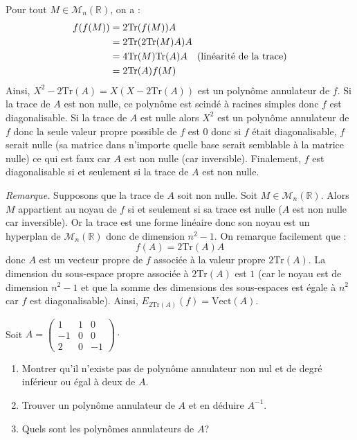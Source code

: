 \documentclass[a4paper,10pt]{report}
\begin{document}
\medskip
%

\noindent Pour tout $M \in \mathcal{M}_n(\mathbb{R})$, on a :
\begin{align*}
f(f(M)) & =  2\textrm{Tr}(f(M)) A \\
& = 2\textrm{Tr}(2\textrm{Tr}(M) A) A \\
& = 4 \textrm{Tr}(M) \textrm{Tr}(A) A \quad \hbox{(linéarité de la trace)} \\
& = 2 \textrm{Tr}(A) f(M)
\end{align*}
Ainsi, $X^2-2\textrm{Tr}(A)= X(X- 2 \textrm{Tr}(A))$ est un polynôme annulateur de $f$. Si la trace de $A$ est non nulle, ce polynôme est scindé à racines simples donc $f$ est diagonalisable. Si la trace de $A$ est nulle alors $X^2$ est un polynôme annulateur de $f$ donc la seule valeur propre possible de $f$ est $0$ donc si $f$ était diagonalisable, $f$ serait nulle (sa matrice dans n'importe quelle base serait semblable à la matrice nulle) ce qui est faux car $A$ est non nulle (car inversible). Finalement, $f$ est diagonalisable si et seulement si la trace de $A$ est non nulle.

\medskip

\noindent \textit{Remarque.} Supposons que la trace de $A$ soit non nulle. Soit $M \in \mathcal{M}_n(\mathbb{R})$. Alors $M$ appartient au noyau de $f$ si et seulement si sa trace est nulle ($A$ est non nulle car inversible). Or la trace est une forme linéaire donc son noyau est un hyperplan de $\mathcal{M}_n(\mathbb{R})$ donc de dimension $n^2-1$. On remarque facilement que :
$$ f(A) = 2 \textrm{Tr}(A) A$$
donc $A$ est un vecteur propre de $f$ associée à la valeur propre $2 \textrm{Tr}(A)$. La dimension du sous-espace propre associée à $2 \textrm{Tr}(A)$ est $1$ (car le noyau est de dimension $n^2-1$ et que la somme des dimensions des sous-espaces est égale à $n^2$ car $f$ est diagonalisable). Ainsi, $E_{2\textrm{Tr}(A)}(f) = \textrm{Vect}(A)$.




\begin{Exa} Soit $A = \begin{pmatrix}
1 & 1 & 0 \\
-1 & 0 & 0 \\
2 & 0 & -1 
\end{pmatrix}\cdot$
\begin{enumerate}
\item Montrer qu'il n'existe pas de polynôme annulateur non nul et de degré inférieur ou égal à deux de $A$.
\item Trouver un polynôme annulateur de $A$ et en déduire $A^{-1}$.
\item Quels sont les polynômes annulateurs de $A$?
\end{enumerate}
\end{Exa}
\end{document}
